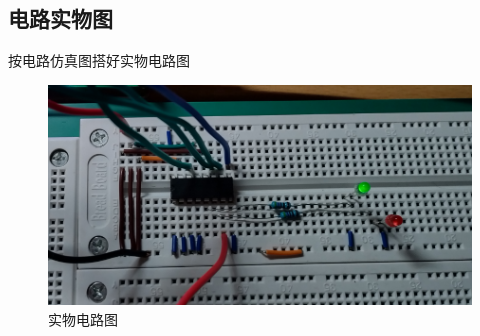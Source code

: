 \documentclass{ctexart}
\begin{document}
\subsection{电路实物图}
按电路仿真图搭好实物电路图
\begin{figure}[H]
    \centering
    \includegraphics[width=0.6\linewidth]{实际电路图.png}
    \caption{实物电路图}
    \label{fig:实物电路图}
\end{figure}
\end{document}
